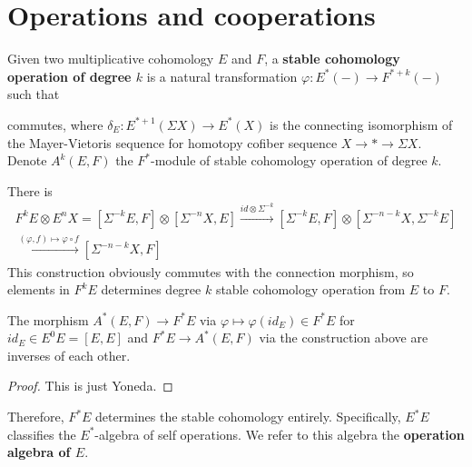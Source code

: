\section{Operations and cooperations}\label{sec:preliminary-operationscooperation}
\begin{definition}
\cite{PreSwitzer}
  Given two multiplicative cohomology $E$ and $F$, a \textbf{stable cohomology operation of degree $k$} is a natural transformation $\varphi: E^*(-) \to F^{*+k}(-)$ such that 
  \begin{center}
  \end{center}commutes, where $\delta_E: E^{*+1}(\Sigma X)\to E^{*}(X)$ is the connecting isomorphism of the Mayer-Vietoris sequence for homotopy cofiber sequence $X\to *\to \Sigma X$. Denote $A^k(E,F)$ the $F^*$-module of stable cohomology operation of degree $k$.
\end{definition}

There is 
\begin{align*}
F^kE\otimes E^nX=[\Sigma^{-k}E, F]\otimes [\Sigma^{-n}X, E]\xrightarrow{id\otimes \Sigma^{-k}}[\Sigma^{-k}E, F]\otimes [\Sigma^{-n-k}X, \Sigma^{-k}E]
\\\xrightarrow{(\varphi, f)\mapsto \varphi\circ f} [\Sigma^{-n-k}X, F]
\end{align*}
This construction obviously commutes with the connection morphism, so elements in $F^kE$ determines degree $k$ stable cohomology operation from $E$ to $F$.

\begin{theorem}
\cite{PreSwitzer}
 The morphism $A^*(E,F)\to F^*E$ via $\varphi\mapsto \varphi (id_E)\in F^*E$ for $id_E\in E^0E=[E,E]$ and $F^*E\to A^*(E,F)$ via the construction above are inverses of each other.
\end{theorem}
\begin{proof}
    This is just Yoneda.
\end{proof}

Therefore, $F^*E$ determines the stable cohomology entirely. Specifically, $E^*E$ classifies the $E^*$-algebra of self operations. We refer to this algebra the \textbf{operation algebra of $E$}.

